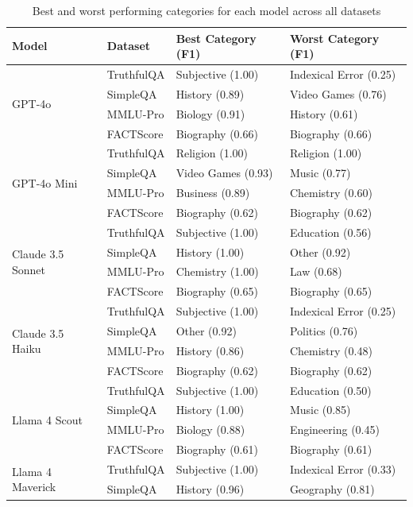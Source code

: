 \begin{table}[htbp]
\centering
\caption{Best and worst performing categories for each model across all datasets}
\begin{tabular}{ll|ll}
\toprule
\textbf{Model} & \textbf{Dataset} & \textbf{Best Category (F1)} & \textbf{Worst Category (F1)} \\
\midrule
\multirow{4}{*}{GPT-4o} & TruthfulQA & Subjective (1.00) & Indexical Error (0.25) \\
 & SimpleQA & History (0.89) & Video Games (0.76) \\
 & MMLU-Pro & Biology (0.91) & History (0.61) \\
 & FACTScore & Biography (0.66) & Biography (0.66) \\
\cline{1-4}
\multirow{4}{*}{GPT-4o Mini} & TruthfulQA & Religion (1.00) & Religion (1.00) \\
 & SimpleQA & Video Games (0.93) & Music (0.77) \\
 & MMLU-Pro & Business (0.89) & Chemistry (0.60) \\
 & FACTScore & Biography (0.62) & Biography (0.62) \\
\cline{1-4}
\multirow{4}{*}{Claude 3.5 Sonnet} & TruthfulQA & Subjective (1.00) & Education (0.56) \\
 & SimpleQA & History (1.00) & Other (0.92) \\
 & MMLU-Pro & Chemistry (1.00) & Law (0.68) \\
 & FACTScore & Biography (0.65) & Biography (0.65) \\
\cline{1-4}
\multirow{4}{*}{Claude 3.5 Haiku} & TruthfulQA & Subjective (1.00) & Indexical Error (0.25) \\
 & SimpleQA & Other (0.92) & Politics (0.76) \\
 & MMLU-Pro & History (0.86) & Chemistry (0.48) \\
 & FACTScore & Biography (0.62) & Biography (0.62) \\
\cline{1-4}
\multirow{4}{*}{Llama 4 Scout} & TruthfulQA & Subjective (1.00) & Education (0.50) \\
 & SimpleQA & History (1.00) & Music (0.85) \\
 & MMLU-Pro & Biology (0.88) & Engineering (0.45) \\
 & FACTScore & Biography (0.61) & Biography (0.61) \\
\cline{1-4}
\multirow{4}{*}{Llama 4 Maverick} & TruthfulQA & Subjective (1.00) & Indexical Error (0.33) \\
 & SimpleQA & History (0.96) & Geography (0.81) \\

\end{tabular}
\end{table}
